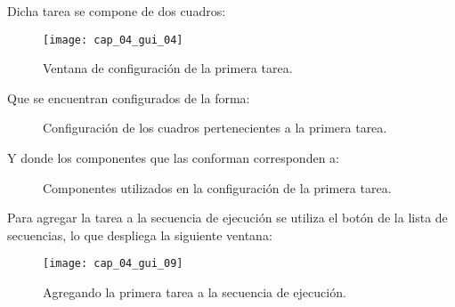 \documentclass[\main/main.tex]{subfiles}
\begin{document}
                \newpage
                \vspace{-6mm}
                Dicha tarea se compone de dos cuadros: 
                \begin{figure}[H]
                    \centering
                    \texttt{[image: cap\_04\_gui\_04]}
                    \caption{Ventana de configuración de la primera tarea.}
                    \label{fig:04_gui_exp03}
                \end{figure} 

                \vspace{-6mm}
                Que se encuentran configurados de la forma:
                \begin{figure}[H]
                    \centering
                     \hspace{5mm}
                    \caption{Configuración de los cuadros pertenecientes a la primera tarea.}
                    \label{fig:04_gui_exp04}
                \end{figure} 

                \newpage
                \vspace{-6mm}
                Y donde los componentes que las conforman corresponden a: 
                \begin{figure}[H]
                    \centering
                     \hspace{5mm}
                    \caption{Componentes utilizados en la configuración de la primera tarea.}
                    \label{fig:04_gui_exp05}
                \end{figure} 

                \vspace{-6mm}
                Para agregar la tarea a la secuencia de ejecución se utiliza el botón  de la lista de secuencias, lo que despliega la siguiente ventana: 
                \begin{figure}[H]
                    \centering
                    \texttt{[image: cap\_04\_gui\_09]}
                    \caption{Agregando la primera tarea a la secuencia de ejecución.}
                    \label{fig:04_gui_exp06}
                \end{figure} 
\end{document}
